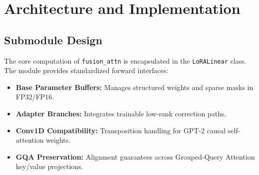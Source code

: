 \section{Architecture and Implementation}

\subsection{Submodule Design}
The core computation of \texttt{fusion_attn} is encapsulated in the \texttt{LoRALinear} class. The module provides standardized forward interfaces:
\begin{itemize}
\item \textbf{Base Parameter Buffers:} Manages structured weights and sparse masks in FP32/FP16.
\item \textbf{Adapter Branches:} Integrates trainable low-rank correction paths.
\item \textbf{Conv1D Compatibility:} Transposition handling for GPT-2 causal self-attention weights.
\item \textbf{GQA Preservation:} Alignment guarantees across Grouped-Query Attention key/value projections.
\end{itemize}
